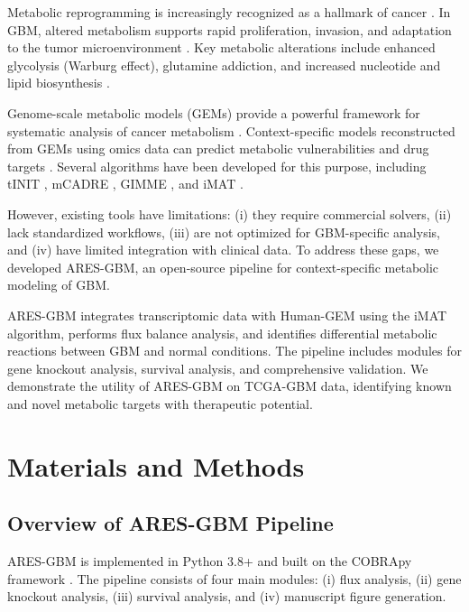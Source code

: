 \documentclass[12pt, a4paper]{article}
\begin{document}
Metabolic reprogramming is increasingly recognized as a hallmark of cancer \citep{hanahan2011hallmarks}. In GBM, altered metabolism supports rapid proliferation, invasion, and adaptation to the tumor microenvironment \citep{mayers2015metabolic}. Key metabolic alterations include enhanced glycolysis (Warburg effect), glutamine addiction, and increased nucleotide and lipid biosynthesis \citep{tonon2005genomics}.

Genome-scale metabolic models (GEMs) provide a powerful framework for systematic analysis of cancer metabolism \citep{lewis2012next}. Context-specific models reconstructed from GEMs using omics data can predict metabolic vulnerabilities and drug targets \citep{agren2014reconstruction}. Several algorithms have been developed for this purpose, including tINIT \citep{agren2014reconstruction}, mCADRE \citep{wang2012systematic}, GIMME \citep{becker2007reconstruction}, and iMAT \citep{zur2010mass}.

However, existing tools have limitations: (i) they require commercial solvers, (ii) lack standardized workflows, (iii) are not optimized for GBM-specific analysis, and (iv) have limited integration with clinical data. To address these gaps, we developed ARES-GBM, an open-source pipeline for context-specific metabolic modeling of GBM.

ARES-GBM integrates transcriptomic data with Human-GEM using the iMAT algorithm, performs flux balance analysis, and identifies differential metabolic reactions between GBM and normal conditions. The pipeline includes modules for gene knockout analysis, survival analysis, and comprehensive validation. We demonstrate the utility of ARES-GBM on TCGA-GBM data, identifying known and novel metabolic targets with therapeutic potential.

\section{Materials and Methods}

\subsection{Overview of ARES-GBM Pipeline}

ARES-GBM is implemented in Python 3.8+ and built on the COBRApy framework \citep{cobrapy2020}. The pipeline consists of four main modules: (i) flux analysis, (ii) gene knockout analysis, (iii) survival analysis, and (iv) manuscript figure generation.
\end{document}
